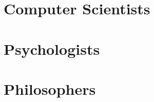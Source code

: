 \documentclass{book}
\numberwithin{equation}{section}
\begin{document}

\part{Computer Scientists}


\part{Psychologists}


\part{Philosophers}


\printbibliography[heading=bibintoc]
\end{document}
